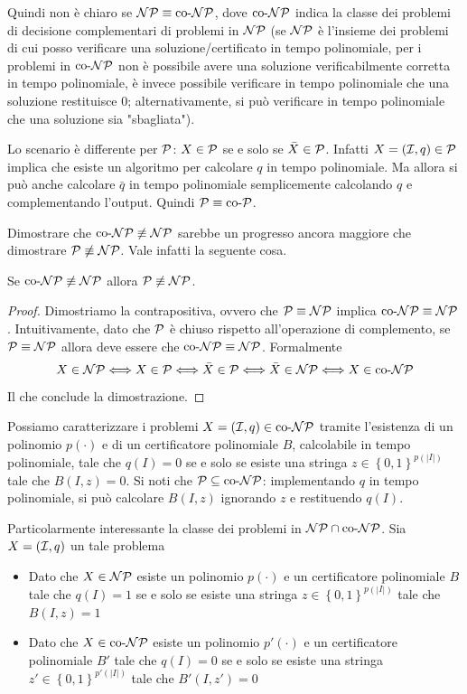 Quindi non è chiaro se $\NP \equiv \coNP$, dove $\coNP$ indica la classe dei problemi di decisione complementari di problemi in $\NP$ (se $\NP$ è l'insieme dei problemi di cui posso verificare una soluzione/certificato in tempo polinomiale, per i problemi in $\coNP$ non è possibile avere una soluzione verificabilmente corretta in tempo polinomiale, è invece possibile verificare in tempo polinomiale che una soluzione restituisce 0; alternativamente, si può verificare in tempo polinomiale che una soluzione sia "sbagliata").

Lo scenario è differente per $\P$: $X \in \P$ se e solo se $\bar X \in \P$. Infatti $X = (\I, q) \in \P$ implica che esiste un algoritmo per calcolare $q$ in tempo polinomiale. Ma allora si può anche calcolare $\bar q$ in tempo polinomiale semplicemente calcolando $q$ e complementando l'output. Quindi $\P \equiv \coP$.

Dimostrare che $\coNP \not \equiv \NP$ sarebbe un progresso ancora maggiore che dimostrare $\P \not \equiv \NP$. Vale infatti la seguente cosa. \\

\begin{fact}
    Se $\coNP \not \equiv \NP$ allora $\P \not \equiv \NP$.
\end{fact}
\begin{proof}
    Dimostriamo la contrapositiva, ovvero che $\P \equiv \NP$ implica $\coNP \equiv \NP$. Intuitivamente, dato che $\P$ è chiuso rispetto all'operazione di complemento, se $\P \equiv \NP$ allora deve essere che $\coNP \equiv \NP$. Formalmente
    $$ X \in \NP \Longleftrightarrow X \in \P \Longleftrightarrow \bar X \in \P \Longleftrightarrow \bar X \in \NP \Longleftrightarrow X \in \coNP $$
    Il che conclude la dimostrazione.
\end{proof}

Possiamo caratterizzare i problemi $X = (\I, q) \in \coNP$ tramite l'esistenza di un polinomio $p(\cdot)$ e di un certificatore polinomiale $B$, calcolabile in tempo polinomiale, tale che $q(I) = 0$ se e solo se esiste una stringa $z \in \left\{0,1\right\}^{p(|I|)}$ tale che $B(I,z) = 0$. Si noti che $\P \subseteq \coNP$: implementando $q$ in tempo polinomiale, si può calcolare $B(I,z)$ ignorando $z$ e restituendo $q(I)$.

Particolarmente interessante la classe dei problemi in $\NP \cap \coNP$. Sia $X = (\I, q)$ un tale problema
\begin{itemize}
    \item Dato che $X \in \NP$ esiste un polinomio $p(\cdot)$ e un certificatore polinomiale $B$ tale che $q(I) = 1$ se e solo se esiste una stringa $z \in \left\{0,1\right\}^{p(|I|)}$ tale che $B(I,z) = 1$

    \item Dato che $X \in \coNP$ esiste un polinomio $p'(\cdot)$ e un certificatore polinomiale $B'$ tale che $q(I) = 0$ se e solo se esiste una stringa $z' \in \left\{0,1\right\}^{p'(|I|)}$ tale che $B'(I, z') = 0$
\end{itemize}

